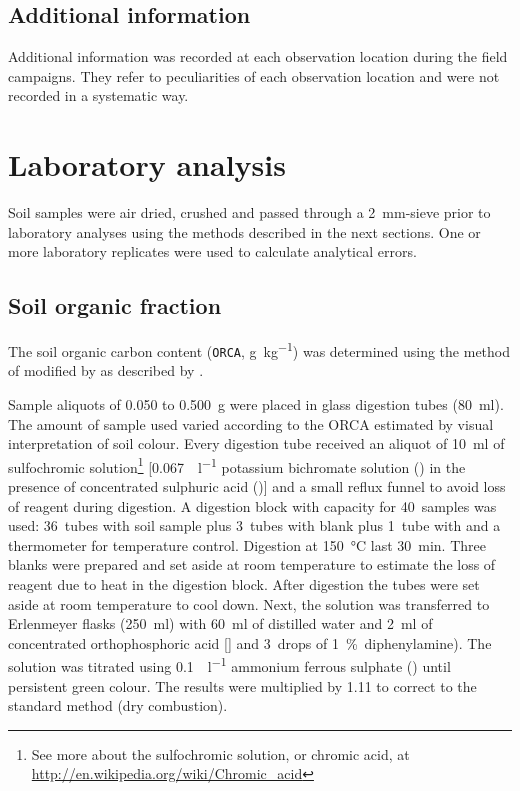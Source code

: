 \tocless\subsection{Additional information}

Additional information was recorded at each observation location during the field campaigns. They refer to 
peculiarities of each observation location and were not recorded in a systematic way.

\tocless\section{Laboratory analysis}

Soil samples were air dried, crushed and passed through a \SI{2}{\milli\metre}-sieve prior to laboratory 
analyses using the methods described in the next sections. One or more laboratory replicates were used to 
calculate analytical errors.

\tocless\subsection{Soil organic fraction}

The soil organic carbon content (\texttt{ORCA}, \si{\gram\per\kilo\gram}) was determined using the method of
 modified by  as described by
.

Sample aliquots of \num{0.050} to \SI{0.500}{\gram} were placed in glass digestion tubes 
(\SI{80}{\milli\litre}). The amount of sample used varied according to the ORCA estimated by visual 
interpretation of soil colour. Every digestion tube received an aliquot of \SI{10}{\milli\litre} of 
sulfochromic solution\footnote{See more about the sulfochromic solution, or chromic acid, at
\url{http://en.wikipedia.org/wiki/Chromic_acid}} [\SI{0.067}{\molle\per\litre} potassium bichromate solution
() in the presence of concentrated sulphuric acid ()] and a small reflux funnel 
to avoid loss of reagent during digestion. A digestion block with capacity for \num{40}~samples was used:
\num{36}~tubes with soil sample plus \num{3}~tubes with blank plus \num{1}~tube with  and a
thermometer for temperature control. Digestion at \SI{150}{\celsius} last \SI{30}{\minute}. Three blanks 
were prepared and set aside at room temperature to estimate the loss of reagent due to heat in the digestion 
block. After digestion the tubes were set aside at room temperature to cool down. Next, the solution was 
transferred to Erlenmeyer flasks (\SI{250}{\milli\litre}) with \SI{60}{\milli\litre} of distilled water and
\SI{2}{\milli\litre} of concentrated orthophosphoric acid [] and \num{3}~drops of 
\SI{1}{\percent}~diphenylamine). The solution was titrated using \SI{0.1}{\molle\per\litre} ammonium ferrous
sulphate () until persistent green colour. The results were multiplied by \num{1.11}
to correct to the standard method (dry combustion).


